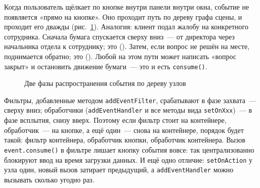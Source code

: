 Когда пользователь щёлкает по кнопке внутри панели внутри окна, событие не
появляется «прямо на кнопке». Оно проходит путь по дереву графа сцены, и
проходит его дважды (рис.~\ref{fig:09-5}). Аналогия: клиент подал жалобу на
конкретного сотрудника. Сначала бумага спускается сверху вниз~--- от директора
через начальника отдела к сотруднику; это 
(). Затем, если вопрос не решён на месте, поднимается обратно;
это  (). Любой на этом пути может написать
«вопрос закрыт» и остановить движение бумаги~--- это и есть \texttt{consume()}.

\begin{figure}[htbp]\centering
{}
\caption{Две фазы распространения события по дереву узлов}\label{fig:09-5}
\end{figure}

Фильтры, добавленные методом \texttt{addEventFilter}, срабатывают в фазе
захвата~--- сверху вниз; обработчики (\texttt{addEventHandler} и все методы вида
\texttt{setOnXxx})~--- в фазе всплытия, снизу вверх. Поэтому если фильтр стоит
на контейнере, обработчик~--- на кнопке, а ещё один~--- снова на контейнере,
порядок будет такой: фильтр контейнера, обработчик кнопки, обработчик
контейнера. Вызов \texttt{event.consume()} в фильтре лишает кнопку события
вовсе: так централизованно блокируют ввод на время загрузки данных. И ещё одно
отличие: \texttt{setOnAction} у узла один, новый вызов затирает предыдущий, а
\texttt{addEventHandler} можно вызывать сколько угодно раз.

